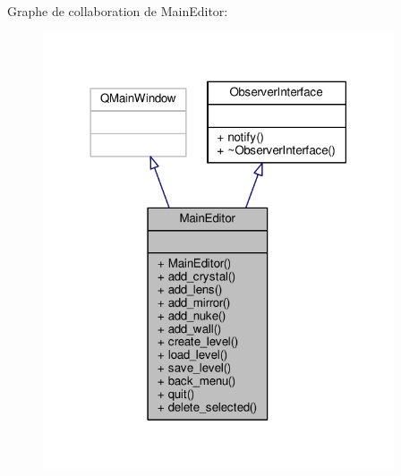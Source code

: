 Graphe de collaboration de Main\+Editor\+:\nopagebreak
\begin{figure}[H]
\begin{center}
\leavevmode
\includegraphics[width=294pt]{db/d11/classMainEditor__coll__graph}
\end{center}
\end{figure}
